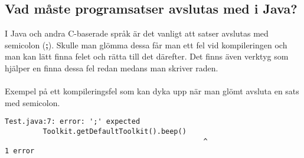 \documentclass[../main.tex]{subfiles}
\begin{document}
\subsection{Vad måste programsatser avslutas med i Java?}
I Java och andra C-baserade språk är det vanligt att satser avslutas med semicolon (\textbf{;}). Skulle man glömma dessa får man ett fel vid kompileringen och man kan lätt finna felet och rätta till det därefter. Det finns även verktyg som hjälper en finna dessa fel redan medans man skriver raden.\\
\\
Exempel på ett kompileringsfel som kan dyka upp när man glömt avsluta en sats med semicolon.
\begin{lstlisting}
Test.java:7: error: ';' expected
         Toolkit.getDefaultToolkit().beep()
                                               ^
1 error                                           
\end{lstlisting}
\end{document}
